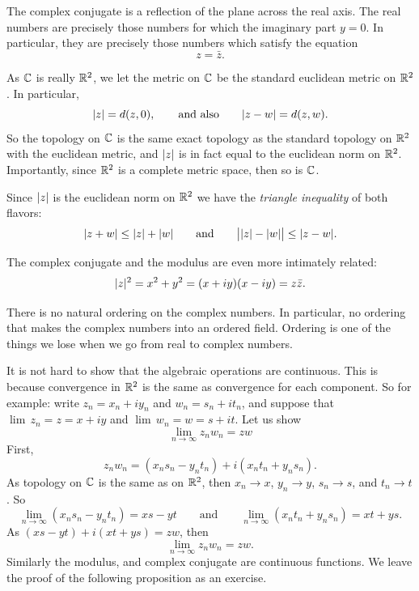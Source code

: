 The complex conjugate is a reflection of the plane across the real axis.
The real numbers are precisely those numbers for which the imaginary
part $y=0$.  In particular, they are precisely those numbers which satisfy
the equation
\begin{equation*}
z = \bar{z} .
\end{equation*}

As ${\mathbb{C}}$ is really ${\mathbb{R}}^2$, we let the metric on ${\mathbb{C}}$ be the standard
euclidean metric on ${\mathbb{R}}^2$.
In particular,
\begin{equation*}
\lvert {z} \rvert = d(z,0) , \qquad 
\text{and also} \qquad 
\lvert {z-w} \rvert = d(z,w) .
\end{equation*}
So the topology on ${\mathbb{C}}$ is
the same exact topology as the standard topology on ${\mathbb{R}}^2$
with the euclidean metric,
and $\lvert {z} \rvert$ is in fact equal to the euclidean norm on ${\mathbb{R}}^2$.
Importantly, since ${\mathbb{R}}^2$ is a complete metric space, then
so is ${\mathbb{C}}$.

Since $\lvert {z} \rvert$ is the euclidean norm on ${\mathbb{R}}^2$ we have the
\emph{triangle inequality}
of both flavors:
\begin{equation*}
\lvert {z+w} \rvert \leq \lvert {z} \rvert+\lvert {w} \rvert \qquad \text{and} \qquad
\big\lvert \lvert {z} \rvert-\lvert {w} \rvert \big\rvert \leq \lvert {z-w} \rvert .
\end{equation*}

The complex conjugate and the modulus are even more intimately related:
\begin{equation*}
\lvert {z} \rvert^2 =
x^2+y^2 =
(x+iy)(x-iy) =
z \bar{z} .
\end{equation*}

\begin{remark}
There is no natural ordering on the complex numbers.
In particular,
no ordering that makes the complex numbers into an ordered field.
Ordering is one of the things we lose when we go from real to complex
numbers.
\end{remark}

It is not hard to show that the algebraic operations are
continuous.  This is because convergence in 
${\mathbb{R}}^2$ is the same as convergence for each component.  So for example:
write $z_n = x_n + iy_n$ and
$w_n = s_n + it_n$, and suppose that
$\lim \, z_n = z = x+iy$ and $\lim \, w_n = w = s+it$.
Let us show
\begin{equation*}
\lim_{n\to\infty} z_n w_n = zw
\end{equation*}
First,
\begin{equation*}
z_n w_n = (x_ns_n-y_nt_n) + i(x_nt_n+y_ns_n) .
\end{equation*}
As topology on ${\mathbb{C}}$ is the same as on ${\mathbb{R}}^2$, then
$x_n \to x$, $y_n \to y$, $s_n \to s$, and $t_n \to t$.
So
\begin{equation*}
\lim_{n\to\infty} (x_ns_n-y_nt_n) = xs-yt \qquad \text{and} \qquad
\lim_{n\to\infty} (x_nt_n+y_ns_n) = xt+ys .
\end{equation*}
As
$(xs-yt)+i(xt+ys) = zw$, then
\begin{equation*}
\lim_{n\to\infty} z_n w_n = zw .
\end{equation*}
Similarly the modulus, and complex conjugate are continuous functions.  We
leave the proof of the following proposition as an exercise.

